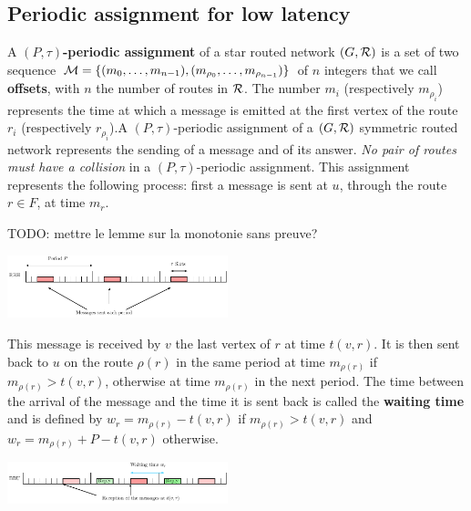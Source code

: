 \documentclass[10pt, conference, letterpaper]{IEEEtran}
\newcommand{\todo}[1]{{\color{red} TODO: {#1}}}
\begin{document}
      
      \subsection{Periodic assignment for low latency}

         
         A {\bf $(P,\tau)$-periodic assignment} of a star routed network $(G,\cal R)$ is a set of two sequence  ${\cal M}=\{(m_0, \ldots ,m_{n-1}),(m_{\rho_0}, \ldots ,m_{\rho_{n-1}})\}$ of $n$ integers that we call {\bf offsets}, with $n$ the number of routes in $\cal R$. The number $m_{i}$ (respectively $m_{\rho_i}$) represents the time at which a message is emitted at the first vertex of the route $r_{i}$ (respectively $r_{\rho_i}$).A $(P,\tau)$-periodic assignment of a $(G,{\cal R})$ symmetric routed network represents
 the sending of a message and of its answer. \emph{No pair of routes must have a collision} in a $(P,\tau)$-periodic assignment.
   This assignment represents the following process: first a message is sent at $u$, through the route $r \in F$, at time $m_r$.
       
      \todo{mettre le lemme sur la monotonie sans preuve?}
      
      \begin{center}
     \hspace{-0.5cm} \includegraphics[width=0.48\textwidth]{rrh.pdf}
      \end{center}
      
      

      This message is received by $v$ the last vertex of $r$ at time $t(v,r)$. It is then sent back to $u$ on the route $\rho(r)$ in the same period at time $m_{\rho(r)}$ if $m_{\rho(r)} > t(v,r)$, otherwise at time $m_{\rho(r)}$ in the next period. The time between the arrival of the message and the time it is sent back is called the \textbf{waiting time} and is defined by $w_r = m_{\rho(r)} - t(v,r)$ if $m_{\rho(r)} > t(v,r)$ and $w_r = m_{\rho(r)} + P - t(v,r)$ otherwise.
 
       \begin{center}
     \hspace{-0.5cm} \includegraphics[width=0.48\textwidth]{BBU.pdf}
      \end{center}
     
\end{document}
